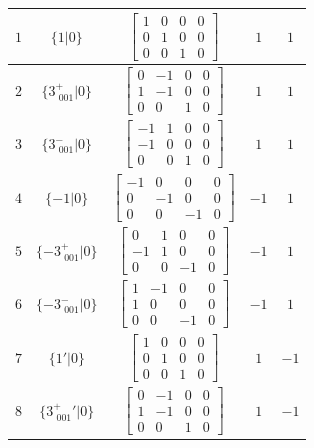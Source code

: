 \documentclass[fleqn,8pt]{jsarticle}
\begin{document}
\begin{longtable}{ccccc}
$ 1 $ & $ \{1|0\} $ & $ \begin{bmatrix} 1 & 0 & 0 & 0 \\ 0 & 1 & 0 & 0 \\ 0 & 0 & 1 & 0 \end{bmatrix} $ & $ 1 $ & $ 1 $ \\ \hline
$ 2 $ & $ \{3^{+}_{\,\,001}|0\} $ & $ \begin{bmatrix} 0 & -1 & 0 & 0 \\ 1 & -1 & 0 & 0 \\ 0 & 0 & 1 & 0 \end{bmatrix} $ & $ 1 $ & $ 1 $ \\ \hline
$ 3 $ & $ \{3^{-}_{\,\,001}|0\} $ & $ \begin{bmatrix} -1 & 1 & 0 & 0 \\ -1 & 0 & 0 & 0 \\ 0 & 0 & 1 & 0 \end{bmatrix} $ & $ 1 $ & $ 1 $ \\ \hline
$ 4 $ & $ \{-1|0\} $ & $ \begin{bmatrix} -1 & 0 & 0 & 0 \\ 0 & -1 & 0 & 0 \\ 0 & 0 & -1 & 0 \end{bmatrix} $ & $ -1 $ & $ 1 $ \\ \hline
$ 5 $ & $ \{-3^{+}_{\,\,001}|0\} $ & $ \begin{bmatrix} 0 & 1 & 0 & 0 \\ -1 & 1 & 0 & 0 \\ 0 & 0 & -1 & 0 \end{bmatrix} $ & $ -1 $ & $ 1 $ \\ \hline
$ 6 $ & $ \{-3^{-}_{\,\,001}|0\} $ & $ \begin{bmatrix} 1 & -1 & 0 & 0 \\ 1 & 0 & 0 & 0 \\ 0 & 0 & -1 & 0 \end{bmatrix} $ & $ -1 $ & $ 1 $ \\ \hline
$ 7 $ & $ \{1{}'|0\} $ & $ \begin{bmatrix} 1 & 0 & 0 & 0 \\ 0 & 1 & 0 & 0 \\ 0 & 0 & 1 & 0 \end{bmatrix} $ & $ 1 $ & $ -1 $ \\ \hline
$ 8 $ & $ \{3^{+}_{\,\,001}{}'|0\} $ & $ \begin{bmatrix} 0 & -1 & 0 & 0 \\ 1 & -1 & 0 & 0 \\ 0 & 0 & 1 & 0 \end{bmatrix} $ & $ 1 $ & $ -1 $ \\ \hline

\end{longtable}
\end{document}
